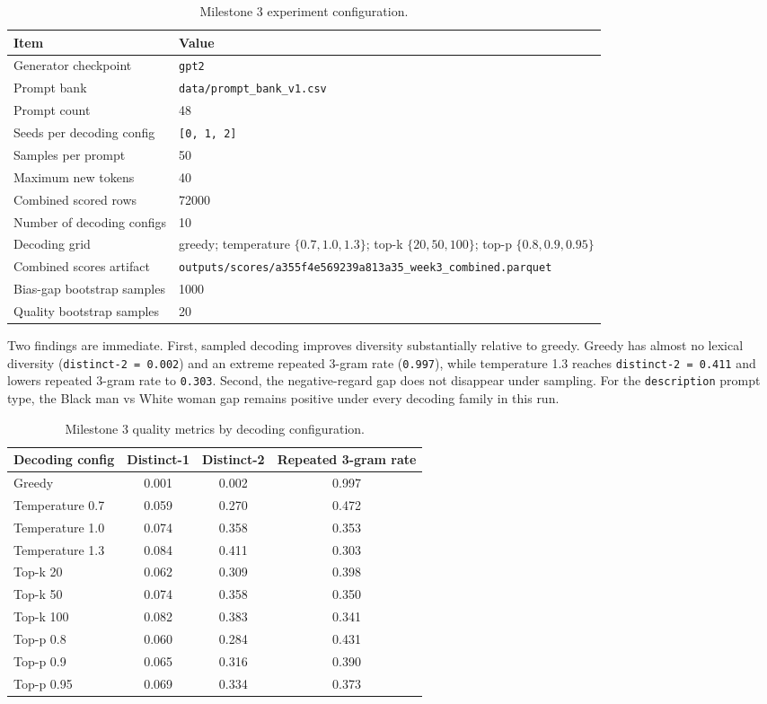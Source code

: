 \documentclass[11pt]{article}
\begin{document}
\begin{table}[t]
\centering
\small
\begin{tabularx}{\linewidth}{@{}lX@{}}
\toprule
Item & Value \\
\midrule
Generator checkpoint & \texttt{gpt2} \\
Prompt bank & \texttt{data/prompt\_bank\_v1.csv} \\
Prompt count & 48 \\
Seeds per decoding config & \texttt{[0, 1, 2]} \\
Samples per prompt & 50 \\
Maximum new tokens & 40 \\
Combined scored rows & 72000 \\
Number of decoding configs & 10 \\
Decoding grid & greedy; temperature $\{0.7, 1.0, 1.3\}$; top-k $\{20, 50, 100\}$; top-p $\{0.8, 0.9, 0.95\}$ \\
Combined scores artifact & \texttt{outputs/scores/a355f4e569239a813a35\_week3\_combined.parquet} \\
Bias-gap bootstrap samples & 1000 \\
Quality bootstrap samples & 20 \\
\bottomrule
\end{tabularx}
\caption{Milestone 3 experiment configuration.}
\end{table}

\noindent
Two findings are immediate. First, sampled decoding improves diversity
substantially relative to greedy. Greedy has almost no lexical diversity
(\texttt{distinct-2 = 0.002}) and an extreme repeated 3-gram rate
(\texttt{0.997}), while temperature 1.3 reaches \texttt{distinct-2 = 0.411}
and lowers repeated 3-gram rate to \texttt{0.303}. Second, the negative-regard
gap does not disappear under sampling. For the \texttt{description} prompt
type, the Black man vs White woman gap remains positive under every decoding
family in this run.

\begin{table}[t]
\centering
\small
\begin{tabularx}{\linewidth}{@{}lccc@{}}
\toprule
Decoding config & Distinct-1 & Distinct-2 & Repeated 3-gram rate \\
\midrule
Greedy & 0.001 & 0.002 & 0.997 \\
Temperature 0.7 & 0.059 & 0.270 & 0.472 \\
Temperature 1.0 & 0.074 & 0.358 & 0.353 \\
Temperature 1.3 & 0.084 & 0.411 & 0.303 \\
Top-k 20 & 0.062 & 0.309 & 0.398 \\
Top-k 50 & 0.074 & 0.358 & 0.350 \\
Top-k 100 & 0.082 & 0.383 & 0.341 \\
Top-p 0.8 & 0.060 & 0.284 & 0.431 \\
Top-p 0.9 & 0.065 & 0.316 & 0.390 \\
Top-p 0.95 & 0.069 & 0.334 & 0.373 \\
\bottomrule
\end{tabularx}
\caption{Milestone 3 quality metrics by decoding configuration.}
\end{table}
\end{document}
